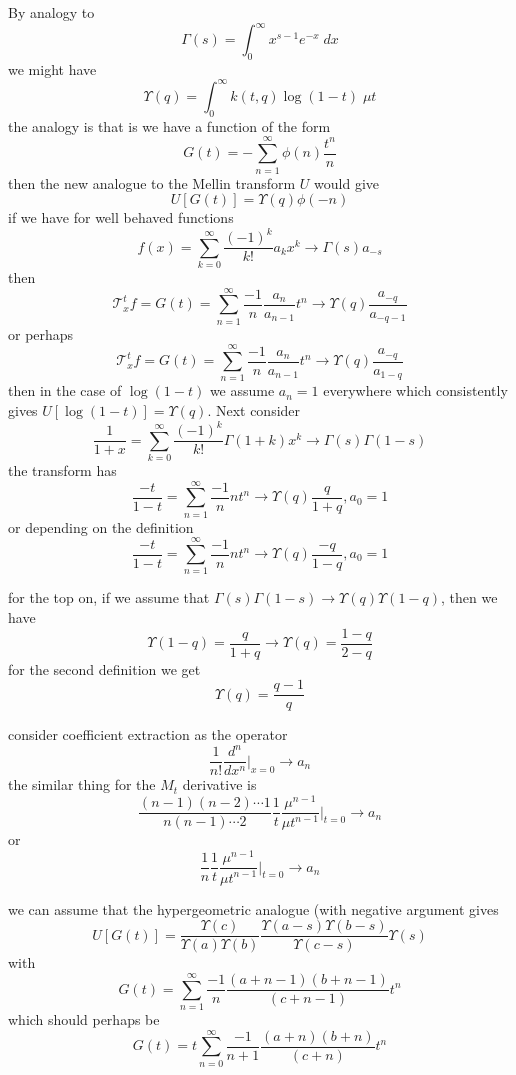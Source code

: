 \documentclass{article}
\begin{document}
By analogy to 
$$
\Gamma(s) = \int_0^\infty x^{s-1}e^{-x} \; dx
$$
we might have
$$
\Upsilon(q) = \int_0^\infty k(t,q) \log(1-t) \; \mu t
$$
the analogy is that is we have a function of the form 
$$
G(t) = -\sum_{n=1}^\infty \phi(n)\frac{t^n}{n}
$$
then the new analogue to the Mellin transform $U$ would give 
\begin{equation}
U[G(t)] = \Upsilon(q)\phi(-n)
\end{equation}
if we have for well behaved functions
$$
f(x) = \sum_{k=0}^\infty \frac{(-1)^k}{k!} a_k x^k \to \Gamma(s) a_{-s}
$$
then
$$
\mathcal{T}_x^t f = G(t) = \sum_{n=1}^\infty \frac{-1}{n} \frac{a_n}{a_{n-1}}t^n \to \Upsilon(q) \frac{a_{-q}}{a_{-q-1}}
$$
or perhaps
$$
\mathcal{T}_x^t f = G(t) = \sum_{n=1}^\infty \frac{-1}{n} \frac{a_n}{a_{n-1}}t^n \to \Upsilon(q) \frac{a_{-q}}{a_{1-q}}
$$
then in the case of $\log(1-t)$ we assume $a_n=1$ everywhere which consistently gives $U[\log(1-t)] = \Upsilon(q)$. Next consider
$$
\frac{1}{1+x} = \sum_{k=0}^\infty \frac{(-1)^k}{k!} \Gamma(1+k) x^k \to \Gamma(s)\Gamma(1-s)
$$
the transform has 
$$
\frac{-t}{1-t} = \sum_{n=1}^\infty \frac{-1}{n} n t^n \to \Upsilon(q)\frac{q}{1+q}, a_0=1
$$
or depending on the definition
$$
\frac{-t}{1-t} = \sum_{n=1}^\infty \frac{-1}{n} n t^n \to \Upsilon(q)\frac{-q}{1-q}, a_0=1
$$

for the top on, if we assume that $\Gamma(s)\Gamma(1-s) \to \Upsilon(q)\Upsilon(1-q)$, then we have
$$
\Upsilon(1-q) = \frac{q}{1+q} \to \Upsilon(q) = \frac{1-q}{2-q}
$$
for the second definition we get 
$$
\Upsilon(q) = \frac{q-1}{q}
$$

consider coefficient extraction as the operator 
$$
\frac{1}{n!}\frac{d^n}{dx^n} \Bigg|_{x=0} \to a_n
$$
the similar thing for the $M_t$ derivative is 
$$
\frac{(n-1)(n-2)\cdots 1}{n(n-1)\cdots 2} \frac{1}{t}\frac{\mu^{n-1}}{\mu t^{n-1}} \Bigg|_{t=0} \to a_{n}
$$
or
$$
\frac{1}{n} \frac{1}{t}\frac{\mu^{n-1}}{\mu t^{n-1}} \Bigg|_{t=0} \to a_{n}
$$

we can assume that the hypergeometric analogue (with negative argument gives 
$$
U[G(t)] = \frac{\Upsilon(c)}{\Upsilon(a)\Upsilon(b)} \frac{\Upsilon(a-s)\Upsilon(b-s)}{\Upsilon(c-s)} \Upsilon(s)
$$
with 
$$
G(t) = \sum_{n=1}^\infty \frac{-1}{n} \frac{(a+n-1)(b+n-1)}{(c+n-1)} t^n
$$
which should perhaps be
$$
G(t) = t \sum_{n=0}^\infty \frac{-1}{n+1} \frac{(a+n)(b+n)}{(c+n)} t^n
$$
\end{document}
